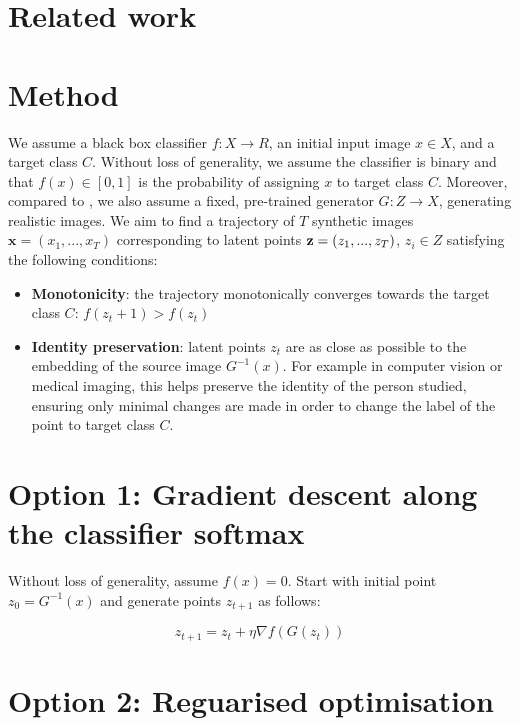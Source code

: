 \documentclass{article}
\begin{document}
\section{Related work}

% 
% 

\section{Method}


We assume a black box classifier $f: X \to R$, an initial input image $x \in X$, and a target class $C$. Without loss of generality, we assume the classifier is binary and that $f(x) \in [0,1]$ is the probability of assigning $x$ to target class $C$. Moreover, compared to \cite{singla2019explanation}, we also assume a fixed, pre-trained generator $G: Z \to X$, generating realistic images. We aim to find a trajectory of $T$ synthetic images $\textbf{x} = (x_1, ..., x_T)$ corresponding to latent points $\textbf{z} = (z_1, ..., z_T)$, $z_i \in Z$ satisfying the following conditions:
\begin{itemize}
 \item \textbf{Monotonicity}: the trajectory monotonically converges towards the target class $C$: $f(z_t+1) > f(z_{t})$
 \item \textbf{Identity preservation}: latent points $z_t$ are as close as possible to the embedding of the source image $G^{-1}(x)$. For example in computer vision or medical imaging, this helps preserve the identity of the person studied, ensuring only minimal changes are made in order to change the label of the point to target class $C$.
\end{itemize}


\section{Option 1: Gradient descent along the classifier softmax}

Without loss of generality, assume $f(x) = 0$. Start with initial point $z_0 = G^{-1}(x)$ and generate points $z_{t+1}$ as follows:

\begin{equation}
z_{t+1} = z_t + \eta \nabla f(G(z_t))
\end{equation}



\section{Option 2: Reguarised optimisation}
\end{document}
